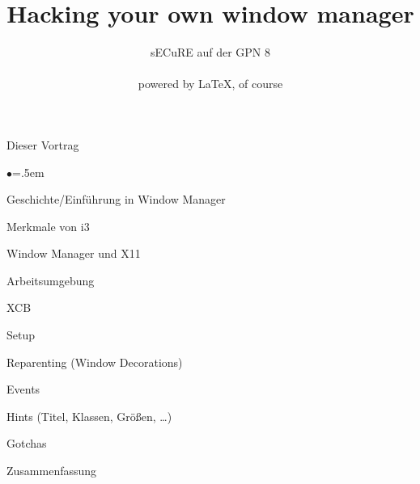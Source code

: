 \documentclass[mode=print,paper=screen,style=jefka]{powerdot}
\title{Hacking your own window manager}
\author{sECuRE auf der GPN 8\\
~\\
powered by \LaTeX, of course}
\begin{document}
\maketitle

\begin{slide}{Dieser Vortrag}
\begin{list}{$\bullet$}{\itemsep=.5em}
	\item Geschichte/Einführung in Window Manager
	\item Merkmale von i3
	\item Window Manager und X11
	\item Arbeitsumgebung
	\item XCB
	\item Setup
	\item Reparenting (Window Decorations)

	\item Events
	\item Hints (Titel, Klassen, Größen, …)
	\item Gotchas
	\item Zusammenfassung
\end{list}
\end{slide}
\end{document}
